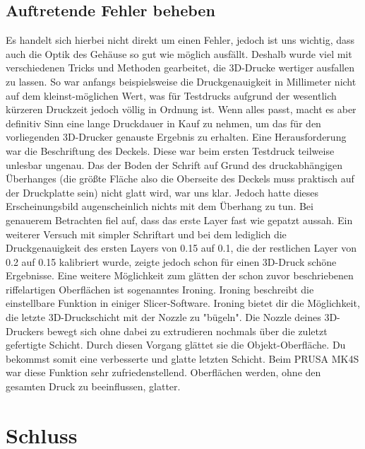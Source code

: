 \documentclass[11pt, twoside]{article}
\begin{document}
\subsection{Auftretende Fehler beheben}
Es handelt sich hierbei nicht direkt um einen Fehler, jedoch ist uns wichtig, dass auch die Optik des Gehäuse so gut wie möglich ausfällt. Deshalb wurde viel mit verschiedenen Tricks und Methoden gearbeitet, die 3D-Drucke wertiger ausfallen zu lassen.\newline
So war anfangs beispielsweise die Druckgenauigkeit in Millimeter nicht auf dem kleinst-möglichen Wert, was für Testdrucks aufgrund der wesentlich kürzeren Druckzeit jedoch völlig in Ordnung ist. Wenn alles passt, macht es aber definitiv Sinn eine lange Druckdauer in Kauf zu nehmen, um das für den vorliegenden 3D-Drucker genauste Ergebnis zu erhalten.\newline
Eine Herausforderung war die Beschriftung des Deckels. Diese war beim ersten Testdruck teilweise unlesbar ungenau. Das der \glqq Boden\grqq{} der Schrift auf Grund des druckabhängigen Überhanges (die größte Fläche also die Oberseite des Deckels muss praktisch auf der Druckplatte sein) nicht glatt wird, war uns klar. Jedoch hatte dieses Erscheinungsbild augenscheinlich nichts mit dem Überhang zu tun. Bei genauerem Betrachten fiel auf, dass das erste Layer fast wie gepatzt aussah. Ein weiterer Versuch mit simpler Schriftart und bei dem lediglich die Druckgenauigkeit des ersten Layers von 0.15 auf 0.1, die der restlichen Layer von 0.2 auf 0.15 kalibriert wurde, zeigte jedoch schon für einen 3D-Druck schöne Ergebnisse.\newline
Eine weitere Möglichkeit zum glätten der schon zuvor beschriebenen riffelartigen Oberflächen ist sogenanntes Ironing. \glqq Ironing beschreibt die einstellbare Funktion in einiger Slicer-Software. Ironing bietet dir die Möglichkeit, die letzte 3D-Druckschicht mit der Nozzle zu "bügeln". Die Nozzle deines 3D-Druckers bewegt sich ohne dabei zu extrudieren nochmals über die zuletzt gefertigte Schicht. Durch diesen Vorgang glättet sie die Objekt-Oberfläche. Du bekommst somit eine verbesserte und glatte letzten Schicht.\grqq{} Beim PRUSA MK4S war diese Funktion sehr zufriedenstellend. Oberflächen werden, ohne den gesamten Druck zu beeinflussen, glatter.\newline
\vspace{4mm}\newline
\parencite[vgl.][]{noauthor_urlnl19_nodate}
\newpage
\section{Schluss}
\end{document}
